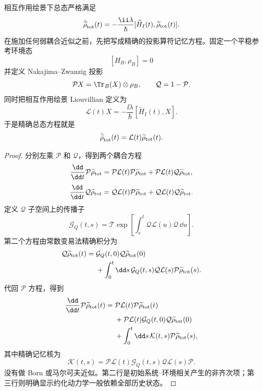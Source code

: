 相互作用绘景下总态严格满足
\begin{equation}
\dot{\widetilde\rho}_{\rm tot}(t)
=-\frac{\ii\lambda}{\hbar}
[\widetilde H_I(t),\widetilde\rho_{\rm tot}(t)].
\label{eq:phys-oqs-interaction-vn}
\end{equation}
在施加任何弱耦合近似之前，先把写成精确的投影算符记忆方程。固定一个平稳参考环境态
\[
[H_B,\rho_B]=0
\]
并定义 Nakajima--Zwanzig 投影
\begin{equation}\label{eq:phys-oqs-nz-projectors}
\mathcal P X
=
\Tr_B(X)\otimes\rho_B,
\qquad
\mathcal Q=1-\mathcal P .
\end{equation}
同时把相互作用绘景 Liouvillian 定义为
\begin{equation}\label{eq:phys-oqs-interaction-liouvillian}
\mathcal L(t)X
=
-\frac{\ii\lambda}{\hbar}
[\widetilde H_I(t),X].
\end{equation}
于是精确总态方程就是
\[
\dot{\widetilde\rho}_{\rm tot}(t)
=
\mathcal L(t)\widetilde\rho_{\rm tot}(t).
\]

\begin{proof}
分别左乘 \(\mathcal P\) 和 \(\mathcal Q\)，得到两个耦合方程
\[
\frac{\dd}{\dd t}\mathcal P\widetilde\rho_{\rm tot}
=
\mathcal P\mathcal L(t)\mathcal P\widetilde\rho_{\rm tot}
+
\mathcal P\mathcal L(t)\mathcal Q\widetilde\rho_{\rm tot},
\]
\[
\frac{\dd}{\dd t}\mathcal Q\widetilde\rho_{\rm tot}
=
\mathcal Q\mathcal L(t)\mathcal P\widetilde\rho_{\rm tot}
+
\mathcal Q\mathcal L(t)\mathcal Q\widetilde\rho_{\rm tot}.
\]
定义 \(\mathcal Q\) 子空间上的传播子
\begin{equation}\label{eq:phys-oqs-q-propagator}
\mathcal G_Q(t,s)
=
\mathcal T
\exp\!\left[
\int_s^t
\mathcal Q\mathcal L(u)\mathcal Q\,\dd u
\right].
\end{equation}
第二个方程由常数变易法精确积分为
\[
\begin{aligned}
\mathcal Q\widetilde\rho_{\rm tot}(t)
={}&
\mathcal G_Q(t,0)
\mathcal Q\widetilde\rho_{\rm tot}(0)
\\
&+
\int_0^t\dd s\,
\mathcal G_Q(t,s)
\mathcal Q\mathcal L(s)\mathcal P
\widetilde\rho_{\rm tot}(s).
\end{aligned}
\]
代回 \(\mathcal P\) 方程，得到
\begin{align}
\frac{\dd}{\dd t}\mathcal P\widetilde\rho_{\rm tot}(t)
={}&
\mathcal P\mathcal L(t)\mathcal P
\widetilde\rho_{\rm tot}(t)
\nonumber\\
&+
\mathcal P\mathcal L(t)\mathcal G_Q(t,0)
\mathcal Q\widetilde\rho_{\rm tot}(0)
\nonumber\\
&+
\int_0^t\dd s\,
\mathcal K(t,s)
\mathcal P\widetilde\rho_{\rm tot}(s),
\label{eq:phys-oqs-exact-nz}
\end{align}
其中精确记忆核为
\begin{equation}\label{eq:phys-oqs-exact-memory-kernel}
\mathcal K(t,s)
=
\mathcal P\mathcal L(t)
\mathcal G_Q(t,s)
\mathcal Q\mathcal L(s)\mathcal P.
\end{equation}
没有做 Born 或马尔可夫近似。第二行是初始系统--环境相关产生的非齐次项；第三行则明确显示约化动力学一般依赖全部历史状态。
\end{proof}

